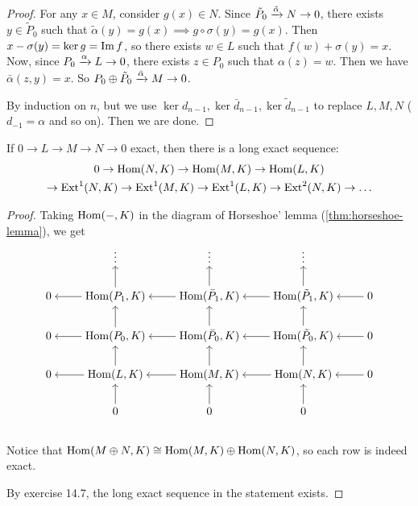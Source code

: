 \begin{theorem}
\begin{proof}
    For any $x \in M$, consider $g(x) \in N$. Since
    $\tilde P_0 \xrightarrow{\tilde \alpha} N \to 0$, there exists $y \in \tilde P_0$
    such that $\tilde\alpha(y) = g(x) \implies g\circ\sigma(y) = g(x)$.
    Then $x - \sigma(y) = \ker g = \operatorname{Im} f$, so there exists $w \in L$
    such that $f(w) + \sigma(y) = x$. Now, since $P_0 \xrightarrow{\alpha} L \to 0$,
    there exists $z \in P_0$ such that $\alpha(z) = w$. Then we have
    $\bar\alpha(z, y) = x$. So $P_0 \oplus \tilde P_0 \xrightarrow{\bar \alpha} M \to 0$.

    By induction on $n$, but we use $\ker d_{n-1}, \ker \bar d_{n-1},
    \ker \tilde d_{n-1}$ to replace $L, M, N$ ($d_{-1} = \alpha$ and so on).
    Then we are done.
  \end{proof}
\end{theorem}

\begin{theorem}
  If $0 \to L \to M \to N \to 0$ exact, then there is a long exact sequence:
  \begin{multline*} 0 \to \operatorname{Hom}(N, K) \to \operatorname{Hom}(M, K) \to \operatorname{Hom}(L, K) \\
    \to \operatorname{Ext}^1(N, K) \to \operatorname{Ext}^1(M, K) \to \operatorname{Ext}^1(L, K) \to \operatorname{Ext}^2(N, K) \to \dots
  \end{multline*}

  \begin{proof}
    Taking $\operatorname{Hom}({-}, K)$ in the diagram of Horseshoe' lemma (\ref{thm:horseshoe-lemma}),
    we get
  \[ \begin{tikzcd}[cramped]
      & \vdots \ar[leftarrow, d] & \vdots \ar[leftarrow, d] & \vdots \ar[leftarrow, d] & \\
      0 \ar[leftarrow, r] & \Hom(P_1, K) \ar[leftarrow, r] \ar[leftarrow, d] & \Hom(\bar P_1, K) \ar[leftarrow, r] \ar[leftarrow, d] & \Hom(\tilde P_1, K) \ar[leftarrow, r] \ar[leftarrow, d] & 0 \\
      0 \ar[leftarrow, r] & \Hom(P_0, K) \ar[leftarrow, r] \ar[leftarrow, d] & \Hom(\bar P_0, K) \ar[leftarrow, r] \ar[leftarrow, d] & \Hom(\tilde P_0, K) \ar[leftarrow, r] \ar[leftarrow, d] & 0 \\
      0 \ar[leftarrow, r] & \Hom(L  , K) \ar[leftarrow, r] \ar[leftarrow, d] & \Hom(M       , K) \ar[leftarrow, r] \ar[leftarrow, d] & \Hom(N         , K) \ar[leftarrow, r] \ar[leftarrow, d] & 0 \\
      & 0 & 0 & 0 & \\
     \end{tikzcd} \]
   Notice that $\operatorname{Hom}(M \oplus N, K) \cong \operatorname{Hom}(M, K) \oplus \operatorname{Hom}(N, K)$, so
   each row is indeed exact.

   By exercise 14.7, the long exact sequence in the statement exists.
  \end{proof}
\end{theorem}

